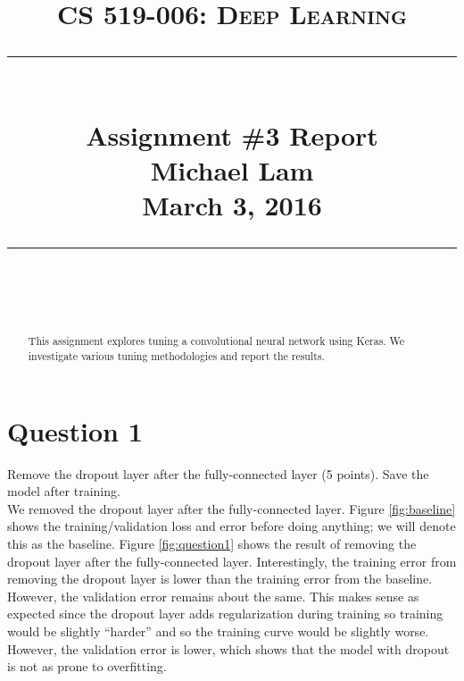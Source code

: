 \documentclass[paper=a4, fontsize=11pt]{scrartcl}
\newcommand{\lecture}{Assignment \#3 Report} %
\newcommand{\lecturedate}{March 3, 2016} %
\newcommand{\scribe}{Michael Lam} %
\begin{document}
\newcommand{\horrule}[1]{\rule{\linewidth}{#1}} %

\title{	
\normalfont \normalsize
\vspace{-30pt}
\textsc{CS 519-006: Deep Learning} \\ [10pt]
\horrule{0.5pt} \\[0.4cm] %
\LARGE \lecture\\ %
\vspace{5pt}
\normalsize \scribe\\
\lecturedate\\
\horrule{2pt} \\[0.5cm] %
}


\date{} %

\maketitle
\vspace{-100pt}

\begin{abstract}
This assignment explores tuning a convolutional neural network using Keras. We investigate various tuning methodologies and report the results.
\end{abstract}

\section{Question 1}

{\small Remove the dropout layer after the fully-connected layer (5 points). Save the model after training.}\\

We removed the dropout layer after the fully-connected layer.  Figure \ref{fig:baseline} shows the training/validation loss and error before doing anything; we will denote this as the baseline.  Figure \ref{fig:question1} shows the result of removing the dropout layer after the fully-connected layer.  Interestingly, the training error from removing the dropout layer is lower than the training error from the baseline.  However, the validation error remains about the same.  This makes sense as expected since the dropout layer adds regularization during training so training would be slightly ``harder'' and so the training curve would be slightly worse.  However, the validation error is lower, which shows that the model with dropout is not as prone to overfitting.
\end{document}
